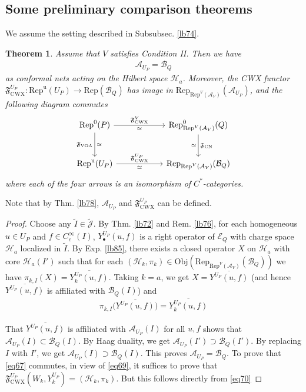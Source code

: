 \documentclass[11pt,b5paper,notitlepage]{article}
\theoremstyle{definition}
\theoremstyle{plain}
\newtheorem{thm}[df]{Theorem}
\newcommand{\fk}{\mathfrak}
\newcommand{\mc}{\mathcal}
\newcommand{\wtd}{\widetilde}
\newcommand{\ovl}{\overline}
\newcommand{\Rep}{\mathrm{Rep}}
\newcommand{\scr}{\mathscr}
\newcommand{\Jtd}{\widetilde{\mathcal J}}
\newcommand{\blt}{\bullet}
\newcommand{\Obj}{\mathrm{Obj}}
\newcommand{\CWX}{{\scriptscriptstyle \mathrm{CWX}}}
\newcommand{\VOA}{{\scriptscriptstyle \mathrm{VOA}}}
\newcommand{\CN}{{\scriptscriptstyle \mathrm{CN}}}
\newcommand{\RepUP}{\mathrm{Rep}^{\mathrm u}(U_P)}
\numberwithin{equation}{section}
\begin{document}
\subsection{Some preliminary comparison theorems}


We assume the setting described in Subsubsec. \ref{lb74}. 

\begin{thm}\label{lb88}
Assume that $V$ satisfies Condition II. Then we have
\begin{align*}
\mc A_{U_P}=\mc B_Q
\end{align*}
as conformal nets acting on the Hilbert space $\mc H_a$. Moreover, the CWX functor $\fk F^{U_P}_\CWX:\RepUP\rightarrow\Rep(\mc B_Q)$ has image in $\Rep_{\Rep^V(\mc A_V)}(\mc A_{U_P})$, and the following diagram commutes
\begin{equation}\label{eq67}
\begin{tikzcd}[row sep=large,column sep=2cm]
\Rep^0(P) \arrow[r,"{\fk F^V_\CWX}","\simeq"'] \arrow[d,"{\fk F_\VOA}"',"\simeq"] & \Rep^0_{\Rep^V(\mc A_V)}(Q) \arrow[d,"{\fk F_\CN}","\simeq"'] \\
\RepUP \arrow[r,"{\fk F^{U_P}_\CWX}","\simeq"']           & \Rep_{\Rep^V(\mc A_V)}(\mc B_Q)          
\end{tikzcd}
\end{equation}
where each of the four arrows is an isomorphism of $C^*$-categories.
\end{thm}

Note that by Thm. \ref{lb78}, $\mc A_{U_P}$ and $\fk F^{U_P}_\CWX$ can be defined.

\begin{proof}
Choose any $\wtd I\in\Jtd$. By Thm. \ref{lb72} and Rem. \ref{lb76}, for each homogeneous $u\in U_P$ and $f\in C_c^\infty(I)$, $\ovl{Y^{U_P}_\blt(u,f)}$ is a right operator of $\scr E_Q$ with charge space $\mc H_a$ localized in $\wtd I$. By Exp. \ref{lb85}, there exists a closed operator $X$ on $\mc H_a$ with core $\mc H_a(I')$ such that for each $(\mc H_k,\pi_k)\in\Obj(\Rep_{\Rep^V(\mc A_V)}(\mc B_Q))$ we have $\pi_{k,I}(X)=\ovl{Y^{U_P}_k(u,f)}$. Taking $k=a$, we get $X=\ovl{Y^{U_P}(u,f)}$ (and hence $\ovl{Y^{U_P}(u,f)}$ is affiliated with $\mc B_Q(I)$) and
\begin{align}\label{eq70}
\pi_{k,I}\big(\ovl{Y^{U_P}(u,f)}\big)=\ovl{Y^{U_P}_k(u,f)}
\end{align}

That $\ovl{Y^{U_P}(u,f)}$ is affiliated with $\mc A_{U_P}(I)$ for all $u,f$ shows that $\mc A_{U_P}(I)\subset\mc B_Q(I)$. By Haag duality, we get $\mc A_{U_P}(I')\supset\mc B_Q(I')$. By replacing $I$ with $I'$, we get $\mc A_{U_P}(I)\supset\mc B_Q(I)$. This proves $\mc A_{U_P}=\mc B_Q$. To prove that \eqref{eq67} commutes, in view of \eqref{eq69}, it suffices to prove that $\fk F_\CWX^{U_P}(W_k,Y_k^{U_P})=(\mc H_k,\pi_k)$. But this follows directly from \eqref{eq70}
\end{proof}
\end{document}
